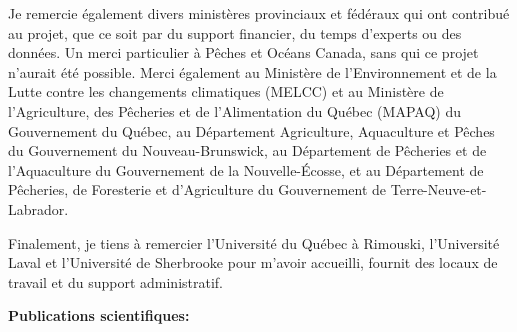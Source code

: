 Je remercie également divers ministères provinciaux et fédéraux qui ont
contribué au projet, que ce soit par du support financier, du temps
d'experts ou des données. Un merci particulier à Pêches et Océans
Canada, sans qui ce projet n'aurait été possible. Merci également au
Ministère de l'Environnement et de la Lutte contre les changements
climatiques (MELCC) et au Ministère de l'Agriculture, des Pêcheries et
de l'Alimentation du Québec (MAPAQ) du Gouvernement du Québec, au
Département Agriculture, Aquaculture et Pêches du Gouvernement du
Nouveau-Brunswick, au Département de Pêcheries et de l'Aquaculture du
Gouvernement de la Nouvelle-Écosse, et au Département de Pêcheries, de
Foresterie et d'Agriculture du Gouvernement de Terre-Neuve-et-Labrador.

Finalement, je tiens à remercier l'Université du Québec à Rimouski,
l'Université Laval et l'Université de Sherbrooke pour m'avoir accueilli,
fournit des locaux de travail et du support administratif.

\textbf{Publications scientifiques:}

